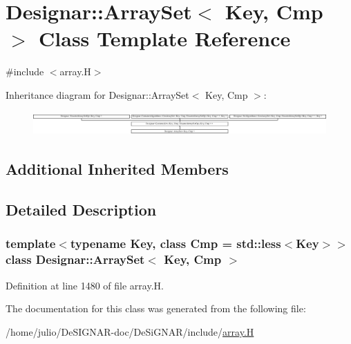 \hypertarget{class_designar_1_1_array_set}{}\section{Designar\+:\+:Array\+Set$<$ Key, Cmp $>$ Class Template Reference}
\label{class_designar_1_1_array_set}


{\ttfamily \#include $<$array.\+H$>$}

Inheritance diagram for Designar\+:\+:Array\+Set$<$ Key, Cmp $>$\+:\begin{figure}[H]
\begin{center}
\leavevmode
\includegraphics[height=0.922570cm]{class_designar_1_1_array_set}
\end{center}
\end{figure}
\subsection*{Additional Inherited Members}


\subsection{Detailed Description}
\subsubsection*{template$<$typename Key, class Cmp = std\+::less$<$\+Key$>$$>$\newline
class Designar\+::\+Array\+Set$<$ Key, Cmp $>$}



Definition at line 1480 of file array.\+H.



The documentation for this class was generated from the following file\+:\begin{DoxyCompactItemize}
\item 
/home/julio/\+De\+S\+I\+G\+N\+A\+R-\/doc/\+De\+Si\+G\+N\+A\+R/include/\hyperlink{array_8_h}{array.\+H}\end{DoxyCompactItemize}
